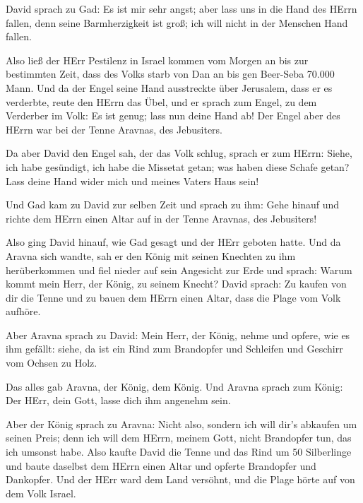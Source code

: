  David sprach zu Gad: Es ist mir sehr angst; aber lass uns
in die Hand des HErrn fallen, denn seine Barmherzigkeit ist groß; ich
will nicht in der Menschen Hand fallen.

 Also ließ der HErr Pestilenz in Israel kommen vom Morgen
an bis zur bestimmten Zeit, dass des Volks starb von Dan an bis gen
Beer-Seba 70.000 Mann.  Und da der Engel seine Hand
ausstreckte über Jerusalem, dass er es verderbte, reute den HErrn das
Übel, und er sprach zum Engel, zu dem Verderber im Volk: Es ist genug;
lass nun deine Hand ab! Der Engel aber des HErrn war bei der Tenne
Aravnas, des Jebusiters.

 Da aber David den Engel sah, der das Volk schlug, sprach
er zum HErrn: Siehe, ich habe gesündigt, ich habe die Missetat getan;
was haben diese Schafe getan? Lass deine Hand wider mich und meines
Vaters Haus sein!

 Und Gad kam zu David zur selben Zeit und sprach zu ihm:
Gehe hinauf und richte dem HErrn einen Altar auf in der Tenne Aravnas,
des Jebusiters!

 Also ging David hinauf, wie Gad gesagt und der HErr
geboten hatte.  Und da Aravna sich wandte, sah er den König
mit seinen Knechten zu ihm herüberkommen und fiel nieder auf sein
Angesicht zur Erde  und sprach: Warum kommt mein Herr, der
König, zu seinem Knecht? David sprach: Zu kaufen von dir die Tenne und
zu bauen dem HErrn einen Altar, dass die Plage vom Volk aufhöre.

 Aber Aravna sprach zu David: Mein Herr, der König, nehme
und opfere, wie es ihm gefällt: siehe, da ist ein Rind zum Brandopfer
und Schleifen und Geschirr vom Ochsen zu Holz.

 Das alles gab Aravna, der König, dem König. Und Aravna
sprach zum König: Der HErr, dein Gott, lasse dich ihm angenehm sein.

 Aber der König sprach zu Aravna: Nicht also, sondern ich
will dir's abkaufen um seinen Preis; denn ich will dem HErrn, meinem
Gott, nicht Brandopfer tun, das ich umsonst habe. Also kaufte David die
Tenne und das Rind um 50 Silberlinge  und baute daselbst
dem HErrn einen Altar und opferte Brandopfer und Dankopfer. Und der HErr
ward dem Land versöhnt, und die Plage hörte auf von dem Volk Israel.
